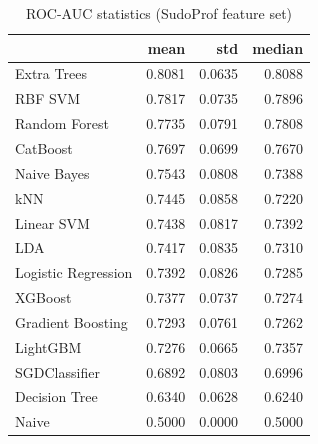 \begin{table}
\caption{ROC-AUC statistics (SudoProf feature set)}
\label{tab:roc-auc_SudoProf_stats}
\begin{tabular}{lrrr}
\toprule
 & mean & std & median \\
\midrule
Extra Trees & 0.8081 & 0.0635 & 0.8088 \\
RBF SVM & 0.7817 & 0.0735 & 0.7896 \\
Random Forest & 0.7735 & 0.0791 & 0.7808 \\
CatBoost & 0.7697 & 0.0699 & 0.7670 \\
Naive Bayes & 0.7543 & 0.0808 & 0.7388 \\
kNN & 0.7445 & 0.0858 & 0.7220 \\
Linear SVM & 0.7438 & 0.0817 & 0.7392 \\
LDA & 0.7417 & 0.0835 & 0.7310 \\
Logistic Regression & 0.7392 & 0.0826 & 0.7285 \\
XGBoost & 0.7377 & 0.0737 & 0.7274 \\
Gradient Boosting & 0.7293 & 0.0761 & 0.7262 \\
LightGBM & 0.7276 & 0.0665 & 0.7357 \\
SGDClassifier & 0.6892 & 0.0803 & 0.6996 \\
Decision Tree & 0.6340 & 0.0628 & 0.6240 \\
Naive & 0.5000 & 0.0000 & 0.5000 \\
\bottomrule
\end{tabular}
\end{table}
